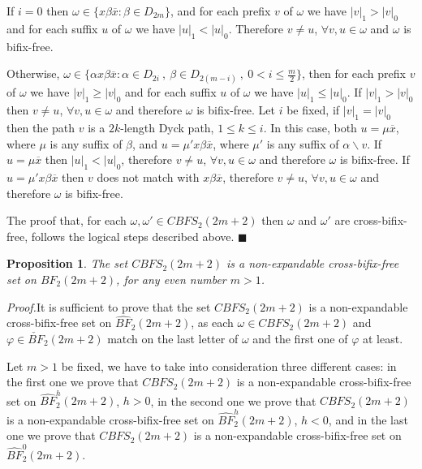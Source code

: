 \documentclass[a4paper,11pt]{article}
\newcommand{\cvd}{\hfill $\blacksquare$\bigskip}
\newtheorem{proposition}{Proposition}[section]
\begin{document}
If $i=0$ then $\omega \in \{x \beta \overline{x} : \beta \in
D_{2m} \}$, and for each prefix $v$ of $\omega$ we have $|v|_1
> |v|_0$ and for each suffix $u$ of $\omega$ we have $|u|_1 <
|u|_0$. Therefore $v \neq u$, $\forall v,u \in \omega$ and
$\omega$ is bifix-free.

Otherwise, $\omega \in \{ \alpha x \beta \overline{x} : \alpha \in
D_{2i} \ , \ \beta \in D_{2(m-i)} \ , \ 0 < i \leq \frac{m}{2}
\}$, then for each prefix $v$ of $\omega$ we have $|v|_1 \geq
|v|_0$ and for each suffix $u$ of $\omega$ we have $|u|_1 \leq
|u|_0$. If $|v|_1 > |v|_0$ then $v \neq u$, $\forall v,u \in
\omega$ and therefore $\omega$ is bifix-free. Let $i$ be fixed, if
$|v|_1=|v|_0$ then the path $v$ is a $2k$-length Dyck path, $1
\leq k \leq i$. In this case, both $u=\mu \overline{x}$, where
$\mu$ is any suffix of $\beta$, and $u=\mu' x \beta \overline{x}$,
where $\mu'$ is any suffix of $\alpha \backslash v$. If $u=\mu
\overline{x}$ then $|u|_1 < |u|_0$, therefore $v \neq u$, $\forall
v,u \in \omega$ and therefore $\omega$ is bifix-free. If $u=\mu' x
\beta \overline{x}$ then $v$ does not match with $x \beta
\overline{x}$, therefore $v \neq u$, $\forall v,u \in \omega$ and
therefore $\omega$ is bifix-free.

The proof that, for each $\omega,\omega' \in CBFS_2(2m+2)$ then
$\omega$ and $\omega'$ are cross-bifix-free, follows the logical
steps described above. \cvd

\begin{proposition}\label{paripariNE}
The set $CBFS_2(2m+2)$ is a non-expandable cross-bifix-free set on
$BF_2(2m+2)$, for any even number $m > 1$.
\end{proposition}
\emph{Proof.}\quad It is sufficient to prove that the set
$CBFS_2(2m+2)$ is a non-expandable cross-bifix-free set on
$\hat{BF}_2(2m+2)$, as each $\omega \in CBFS_2(2m+2)$ and $\varphi
\in \check{BF}_2(2m+2)$ match on the last letter of $\omega$ and
the first one of $\varphi$ at least.

Let $m > 1$ be fixed, we have to take into consideration three
different cases: in the first one we prove that $CBFS_2(2m+2)$ is
a non-expandable cross-bifix-free set on $\hat{BF}^h_2(2m+2)$,
$h>0$, in the second one we prove that $CBFS_2(2m+2)$ is a
non-expandable cross-bifix-free set on $\hat{BF}^h_2(2m+2)$,
$h<0$, and in the last one we prove that $CBFS_2(2m+2)$ is a
non-expandable cross-bifix-free set on $\hat{BF}^0_2(2m+2)$.
\end{document}
